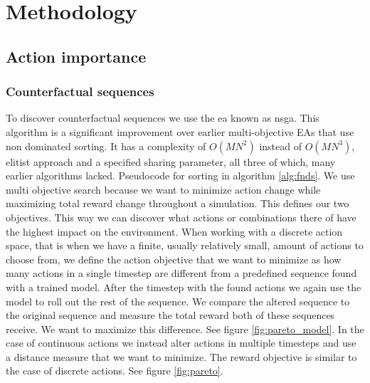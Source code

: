 \documentclass[UKenglish]{uiomasterthesis}
\begin{document}
\medskip
\chapter{Methodology}

\section{Action importance}
\subsection{Counterfactual sequences}
\label{sec:counterfactual}
To discover counterfactual sequences we use the \ac{ea} known as \ac{nsga}. This algorithm is a significant improvement over earlier multi-objective EAs that use non dominated sorting. It has a complexity of $O(MN^2)$ instead of $O(MN^3)$, elitist approach and a specified sharing parameter, all three of which, many earlier algorithms lacked. \cite{Deb2001AFA} Pseudocode for sorting in algorithm \ref{alg:fnds}. 
We use multi objective search because we want to minimize action change while maximizing total reward change throughout a simulation. This defines our two objectives. This way we can discover what actions or combinations there of have the highest impact on the environment. When working with a discrete action space, that is when we have a finite, usually relatively small, amount of actions to choose from, we define the action objective that we want to minimize as how many actions in a single timestep are different from a predefined sequence found with a trained model. After the timestep with the found actions we again use the model to roll out the rest of the sequence. We compare the altered sequence to the original sequence and measure the total reward both of these sequences receive. We want to maximize this difference. See figure \ref{fig:pareto_model}. 
In the case of continuous actions we instead alter actions in multiple timesteps and use a distance measure that we want to minimize. The reward objective is similar to the case of discrete actions. See figure \ref{fig:pareto}.
\end{document}
